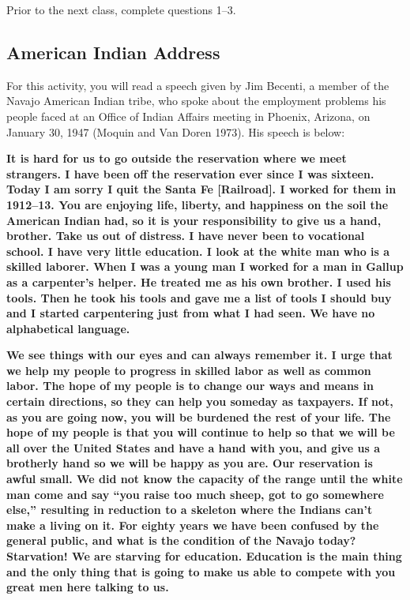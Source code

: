 \documentclass[
]{report}
\begin{document}
Prior to the next class, complete questions 1--3.

\subsection*{American Indian Address}\label{american-indian-address}

For this activity, you will read a speech given by Jim Becenti, a member of the Navajo American Indian tribe, who spoke about the employment problems his people faced at an Office of Indian Affairs meeting in Phoenix, Arizona, on January 30, 1947 (Moquin and Van Doren 1973). His speech is below:

\textbf{It is hard for us to go outside the reservation where we meet strangers. I have been off the reservation ever since I was sixteen. Today I am sorry I quit the Santa Fe {[}Railroad{]}. I worked for them in 1912--13. You are enjoying life, liberty, and happiness on the soil the American Indian had, so it is your responsibility to give us a hand, brother. Take us out of distress. I have never been to vocational school. I have very little education. I look at the white man who is a skilled laborer. When I was a young man I worked for a man in Gallup as a carpenter's helper. He treated me as his own brother. I used his tools. Then he took his tools and gave me a list of tools I should buy and I started carpentering just from what I had seen. We have no alphabetical language.}

\textbf{We see things with our eyes and can always remember it. I urge that we help my people to progress in skilled labor as well as common labor. The hope of my people is to change our ways and means in certain directions, so they can help you someday as taxpayers. If not, as you are going now, you will be burdened the rest of your life. The hope of my people is that you will continue to help so that we will be all over the United States and have a hand with you, and give us a brotherly hand so we will be happy as you are. Our reservation is awful small. We did not know the capacity of the range until the white man come and say ``you raise too much sheep, got to go somewhere else,'' resulting in reduction to a skeleton where the Indians can't make a living on it. For eighty years we have been confused by the general public, and what is the condition of the Navajo today? Starvation! We are starving for education. Education is the main thing and the only thing that is going to make us able to compete with you great men here talking to us.}
\end{document}
